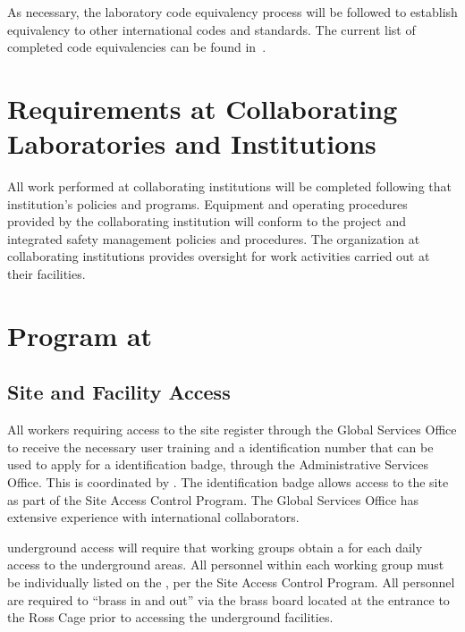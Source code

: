 As necessary, the laboratory code equivalency process will be followed
to establish equivalency to other international codes and
standards. The current list of completed code equivalencies can be
found in~\cite{bib:eshdocdb3303}. %


\section{ Requirements at Collaborating Laboratories and Institutions}

All work performed at collaborating institutions will be completed
following that institution's  policies and
programs. Equipment and operating procedures provided by the
collaborating institution will conform to the  project
 and integrated safety management policies and
procedures. The  organization at collaborating institutions
provides  oversight for work activities carried
out at their facilities.

\section{  Program at }

\subsection{Site and Facility Access}

All  workers requiring access to the  site
register through the \fnal Global Services Office to receive the
necessary user training and a \fnal identification number that can be
used to apply for a  identification badge, through the
 Administrative Services Office. This is coordinated by
. The  identification badge allows access to
the  site as part of the  Site Access Control
Program. The \fnal Global Services Office has extensive experience
with international collaborators.


 underground access will require that working groups
obtain a  for each daily access to the
underground areas.  All personnel within each working group must be
individually listed on the , per the  Site
Access Control Program. All personnel are required to ``brass in and
out'' via the brass board located at the entrance to the Ross Cage prior to accessing the underground facilities.

